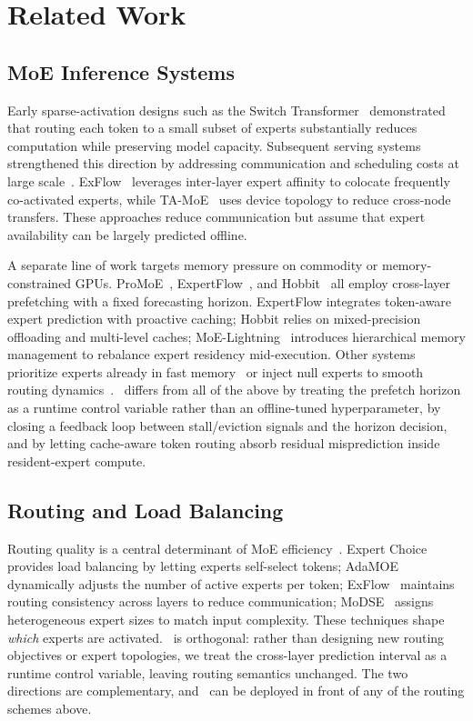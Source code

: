 \section{Related Work}
\label{sec:related_work}

\subsection{MoE Inference Systems}
Early sparse-activation designs such as the Switch Transformer~\cite{fedus2021switch} demonstrated that routing each token to a small subset of experts substantially reduces computation while preserving model capacity. Subsequent serving systems strengthened this direction by addressing communication and scheduling costs at large scale~\cite{riquelme2021scaling, li2025uni, zhu2025exploring, zhang2025duoservemoe, yu2025prescope}. ExFlow~\cite{yao2024exploiting} leverages inter-layer expert affinity to colocate frequently co-activated experts, while TA-MoE~\cite{chen2022ta} uses device topology to reduce cross-node transfers. These approaches reduce communication but assume that expert availability can be largely predicted offline.

A separate line of work targets memory pressure on commodity or memory-constrained GPUs. ProMoE~\cite{song2024promoe}, ExpertFlow~\cite{he2024expertflow}, and Hobbit~\cite{tang2024hobbit} all employ cross-layer prefetching with a fixed forecasting horizon. ExpertFlow integrates token-aware expert prediction with proactive caching; Hobbit relies on mixed-precision offloading and multi-level caches; MoE-Lightning~\cite{cao2024moe} introduces hierarchical memory management to rebalance expert residency mid-execution. Other systems prioritize experts already in fast memory~\cite{bambhaniya2024moe} or inject null experts to smooth routing dynamics~\cite{zeng2024adamoe}. \systemname\ differs from all of the above by treating the prefetch horizon as a runtime control variable rather than an offline-tuned hyperparameter, by closing a feedback loop between stall/eviction signals and the horizon decision, and by letting cache-aware token routing absorb residual misprediction inside resident-expert compute.

\subsection{Routing and Load Balancing}
Routing quality is a central determinant of MoE efficiency~\cite{huang2025dynamic, zhou2025moe}. Expert Choice~\cite{zhou2022mixture} provides load balancing by letting experts self-select tokens; AdaMOE~\cite{zeng2024adamoe} dynamically adjusts the number of active experts per token; ExFlow~\cite{he2024expertflow} maintains routing consistency across layers to reduce communication; MoDSE~\cite{sun2024mixture} assigns heterogeneous expert sizes to match input complexity. These techniques shape \emph{which} experts are activated. \systemname\ is orthogonal: rather than designing new routing objectives or expert topologies, we treat the cross-layer prediction interval as a runtime control variable, leaving routing semantics unchanged. The two directions are complementary, and \systemname\ can be deployed in front of any of the routing schemes above.
